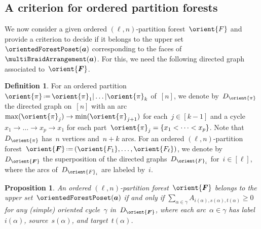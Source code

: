 \documentclass{amsart}
\newtheorem{proposition}[theorem]{Proposition}
\theoremstyle{definition}
\newtheorem{definition}[theorem]{Definition}
\renewcommand{\b}[1]{{\boldsymbol{#1}}} %
\newcommand{\eqdef}{\mbox{\,\raisebox{0.2ex}{\scriptsize\ensuremath{\mathrm:}}\ensuremath{=}\,}} %
\renewcommand{\b}[1]{\boldsymbol{#1}} %
\begin{document}

\subsection{A criterion for ordered partition forests}
\label{subsec:criterionOPF}

We now consider a given ordered $(\ell,n)$-partition forest~$\orient{F}$ and provide a criterion to decide if it belongs to the upper set~$\orientedForestPoset(\b{a})$ corresponding to the faces of~$\multiBraidArrangement(\b{a})$.
For this, we need the following directed graph associated to~$\orient{\b{F}}$.

\begin{definition}
For an ordered partition~$\orient{\pi} \eqdef \orient{\pi}_1 | \dots | \orient{\pi}_k$ of~$[n]$, we denote by~$D_{\orient{\pi}}$ the directed graph on~$[n]$ with an arc~$\max(\orient{\pi}_j) \to \min(\orient{\pi}_{j+1})$ for each~$j \in [k-1]$ and a cycle~${x_1 \to \dots \to x_p \to x_1}$ for each part~$\orient{\pi}_j = \{x_1 < \dots < x_p\}$.
Note that~$D_{\orient{\pi}}$ has~$n$ vertices and~$n + k$ arcs.
For an ordered $(\ell,n)$-partition forest~$\orient{\b{F}} \eqdef (\orient{F_1}, \dots, \orient{F_\ell})$, we denote by~$D_{\orient{\b{F}}}$ the superposition of the directed graphs~$D_{\orient{F}_i}$ for~$i \in [\ell]$, where the arcs of~$D_{\orient{F}_i}$ are labeled by~$i$.
\end{definition}

\begin{proposition}
An ordered $(\ell,n)$-partition forest~$\orient{\b{F}}$ belongs to the upper set~$\orientedForestPoset(\b{a})$ if and only if $\sum_{\alpha \in \gamma} A_{i(\alpha), s(\alpha), t(\alpha)} \ge 0$ for any (simple) oriented cycle~$\gamma$ in~$D_{\orient{\b{F}}}$, where each arc~$\alpha \in \gamma$ has label~$i(\alpha)$, source~$s(\alpha)$, and target~$t(\alpha)$.
\end{proposition}
\end{document}
